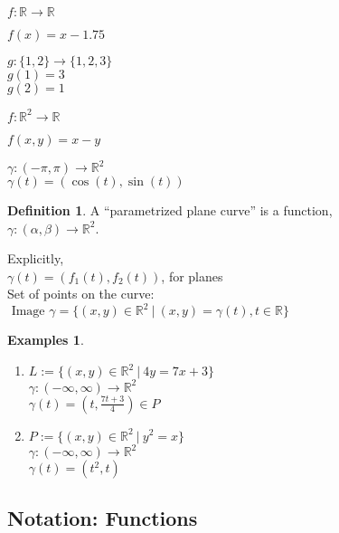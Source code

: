 \documentclass[twocolumn,20pt,fleqn]{extarticle}
\newcommand{\sep}{\vspace{0.5cm}}
\theoremstyle{plain}
\theoremstyle{definition}
\newtheorem*{definition}{Definition}
\newtheorem*{exmpls}{Examples}
\theoremstyle{remark}
\newenvironment*{examples}{\begin{exmpls} ~ \begin{enumerate}}{\end{enumerate}\end{exmpls}}
\begin{document}
$ f: \mathbb{R}  \to \mathbb{R}$

$f(x) = x - 1.75$\\

\sep

  $g : \{1,2\} \to \{1,2,3\}$\\
    $g(1) = 3$\\
    $g(2) = 1$\\

\sep

$ f: \mathbb{R}^2  \to \mathbb{R}$

$f(  x,y  ) = x - y$


\sep

$\gamma :  (-\pi,\pi)  \to \mathbb{R}^2$\\
$\gamma(t) = (\cos(t), \sin(t))$



\newpage



\begin{definition}
  A  ``parametrized plane curve''  is a  function,\\ $\gamma  : (\alpha, \beta) \to \mathbb{R}^2$.
\end{definition}

Explicitly,\\
$\gamma(t) = (f_1(t), f_2(t))$, for planes\\

Set of points on the curve:\\  $\textrm{ Image } \gamma = \{(x,y) \in \mathbb{R}^2 \ |\ (x,y) = \gamma(t), t \in \mathbb{R}\}$




\begin{examples}
  \item $L:=\{(x,y) \in \mathbb{R}^2\ |\ 4y = 7x + 3\}$\\
  $\gamma  : (-\infty,\infty) \to \mathbb{R}^2$ \\
  $\gamma(t) = (t, \frac{7t+3}{4})  \in P$\\
  \item $P:=\{(x,y) \in \mathbb{R}^2\ |\ y^2 = x\}$\\
  $\gamma  : (-\infty,\infty) \to \mathbb{R}^2$ \\
  $\gamma(t) = (t^2, t) $\end{examples}


\clearpage




\subsection{Notation: Functions}
\end{document}
